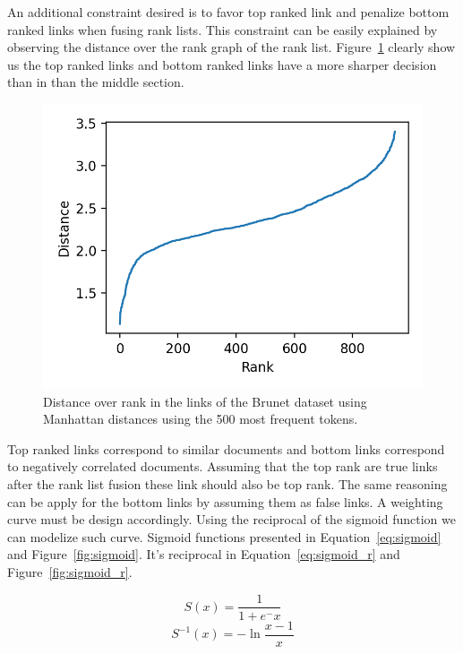 An additional constraint desired is to favor top ranked link and penalize bottom ranked links when fusing rank lists.
This constraint can be easily explained by observing the distance over the rank graph of the rank list.
Figure~\ref{fig:distance_over_rank} clearly show us the top ranked links and bottom ranked links have a more sharper decision than in than the middle section.

\begin{figure}
  \includegraphics[width=\linewidth]{img/distance_over_rank.png}
  \caption{Distance over rank in the links of the Brunet dataset using Manhattan distances using the 500 most frequent tokens.}
  \label{fig:distance_over_rank}
\end{figure}

Top ranked links correspond to similar documents and bottom links correspond to negatively correlated documents.
Assuming that the top rank are true links after the rank list fusion these link should also be top rank.
The same reasoning can be apply for the bottom links by assuming them as false links.
A weighting curve must be design accordingly.
Using the reciprocal of the sigmoid function we can modelize such curve.
Sigmoid functions presented in Equation~\ref{eq:sigmoid} and Figure~\ref{fig:sigmoid}.
It's reciprocal in Equation~\ref{eq:sigmoid_r} and Figure~\ref{fig:sigmoid_r}.

\begin{equation}
  \label{eq:sigmoid}
  S(x) = \frac{1}{1+e^-x}
\end{equation}
\begin{equation}
  \label{eq:sigmoid_r}
  S^{-1}(x) = -\ln{\frac{x-1}{x}}
\end{equation}

